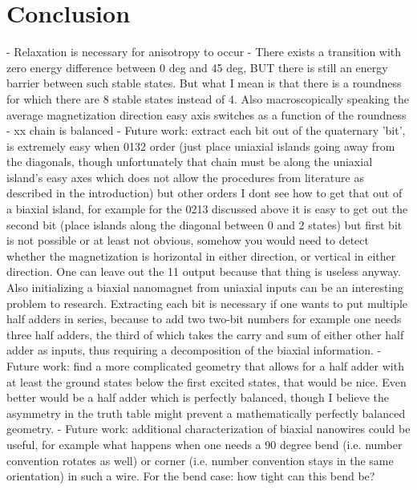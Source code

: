\documentclass[11pt,a4paper,english]{article}
\begin{document}
\section{Conclusion}
- Relaxation is necessary for anisotropy to occur
- There exists a transition with zero energy difference between 0 deg and 45 deg, BUT there is still an energy barrier between such stable states. But what I mean is that there is a roundness for which there are 8 stable states instead of 4. Also macroscopically speaking the average magnetization direction easy axis switches as a function of the roundness
- xx chain is balanced
- Future work: extract each bit out of the quaternary 'bit', is extremely easy when 0132 order (just place uniaxial islands going away from the diagonals, though unfortunately that chain must be along the uniaxial island's easy axes which does not allow the procedures from literature as described in the introduction) but other orders I dont see how to get that out of a biaxial island, for example for the 0213 discussed above it is easy to get out the second bit (place islands along the diagonal between 0 and 2 states) but first bit is not possible or at least not obvious, somehow you would need to detect whether the magnetization is horizontal in either direction, or vertical in either direction. One can leave out the 11 output because that thing is useless anyway. Also initializing a biaxial nanomagnet from uniaxial inputs can be an interesting problem to research. Extracting each bit is necessary if one wants to put multiple half adders in series, because to add two two-bit numbers for example one needs three half adders, the third of which takes the carry and sum of either other half adder as inputs, thus requiring a decomposition of the biaxial information.
- Future work: find a more complicated geometry that allows for a half adder with at least the ground states below the first excited states, that would be nice. Even better would be a half adder which is perfectly balanced, though I believe the asymmetry in the truth table might prevent a mathematically perfectly balanced geometry.
- Future work: additional characterization of biaxial nanowires could be useful, for example what happens when one needs a 90 degree bend (i.e. number convention rotates as well) or corner (i.e. number convention stays in the same orientation) in such a wire. For the bend case: how tight can this bend be?


\newpage


\end{document}
